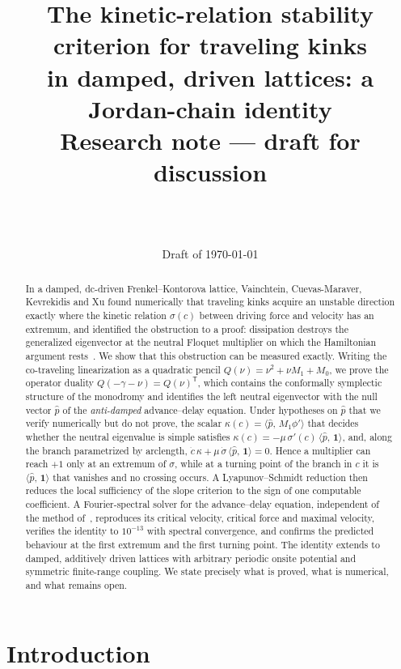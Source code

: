 \documentclass[11pt]{article}
\title{\textbf{The kinetic-relation stability criterion for traveling kinks\\
in damped, driven lattices: a Jordan-chain identity}\\[6pt]
\large Research note --- draft for discussion}
\author{\NoteAuthor\\ \small \NoteAffil\\ \small\texttt{\NoteEmail}}
\date{Draft of \today}
\theoremstyle{plain}
\theoremstyle{definition}
\theoremstyle{remark}
\newcommand{\ip}[2]{\langle #1,\,#2\rangle}
\newcommand{\ph}{\hat p}
\newcommand{\one}{\mathbf 1}
\newcommand{\T}{\mathsf T}
\begin{document}
\maketitle

\begin{abstract}
In a damped, dc-driven Frenkel--Kontorova lattice, Vainchtein, Cuevas-Maraver,
Kevrekidis and Xu found numerically that traveling kinks acquire an unstable
direction exactly where the kinetic relation $\sigma(c)$ between driving force and
velocity has an extremum, and identified the obstruction to a proof: dissipation
destroys the generalized eigenvector at the neutral Floquet multiplier on which the
Hamiltonian argument rests~\cite{VCKX20}. We show that this obstruction can be
measured exactly. Writing the co-traveling linearization as a quadratic pencil
$Q(\nu)=\nu^2+\nu M_1+M_0$, we prove the operator duality $Q(-\gamma-\nu)=Q(\nu)^{\T}$,
which contains the conformally symplectic structure of the monodromy and identifies the
left neutral eigenvector with the null vector $\ph$ of the \emph{anti-damped}
advance--delay equation. Under hypotheses on $\ph$ that we verify numerically but do not
prove, the scalar $\kappa(c)=\ip{\ph}{M_1\phi'}$ that decides whether the neutral
eigenvalue is simple satisfies $\kappa(c)=-\mu\,\sigma'(c)\,\ip{\ph}{\one}$, and, along the
branch parametrized by arclength, $\dot c\,\kappa+\mu\,\dot\sigma\,\ip{\ph}{\one}=0$.
Hence a multiplier can reach $+1$ only at an extremum of $\sigma$, while at a turning point
of the branch in $c$ it is $\ip{\ph}{\one}$ that vanishes and no crossing occurs. A
Lyapunov--Schmidt reduction then reduces the local sufficiency of the slope criterion to
the sign of one computable coefficient. A Fourier-spectral solver for the advance--delay
equation, independent of the method of~\cite{VCKX20}, reproduces its critical velocity,
critical force and maximal velocity, verifies the identity to $10^{-13}$ with spectral
convergence, and confirms the predicted behaviour at the first extremum and the first
turning point. The identity extends to damped, additively driven lattices with arbitrary
periodic onsite potential and symmetric finite-range coupling. We state precisely what is
proved, what is numerical, and what remains open.
\end{abstract}

\tableofcontents

\section{Introduction}\label{sec:intro}
\end{document}
